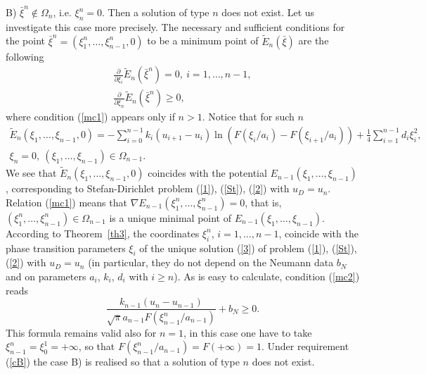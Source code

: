 \documentclass[10pt,a4paper]{amsart}
\numberwithin{equation}{section}
\begin{document}
B) $\bar\xi^n\notin\Omega_n$, i.e. $\xi_n^n=0$. Then a solution of type $n$ does not exist. Let us investigate this case more precisely. The necessary and sufficient conditions for the point $\bar\xi^n=(\xi_1^n,\ldots,\xi_{n-1}^n,0)$ to be a minimum point of $\tilde E_n(\bar\xi)$ are the following
\begin{align}
\label{mc1}
\frac{\partial}{\partial\xi_i} \tilde E_n(\bar\xi^n)=0, \ i=1,\ldots,n-1, \\
\label{mc2}
\frac{\partial}{\partial\xi_n} \tilde E_n(\bar\xi^n)\ge 0,
\end{align}
where condition (\ref{mc1}) appears only if $n>1$. Notice that for such $n$
\begin{align*}
\tilde E_n(\xi_1,\ldots,\xi_{n-1},0)=-\sum_{i=0}^{n-1}k_i(u_{i+1}-u_i)\ln (F(\xi_i/a_i)-F(\xi_{i+1}/a_i))
+\frac{1}{4}\sum_{i=1}^{n-1} d_i\xi_i^2, \\ \xi_n=0, \ (\xi_1,\ldots,\xi_{n-1})\in\Omega_{n-1}.
\end{align*}
We see that $\tilde E_n(\xi_1,\ldots,\xi_{n-1},0)$ coincides with the potential $E_{n-1}(\xi_1,\ldots,\xi_{n-1})$, corresponding to
Stefan-Dirichlet problem (\ref{1}), (\ref{St}), (\ref{2}) with $u_D=u_n$.
Relation (\ref{mc1}) means that $\nabla E_{n-1}(\xi_1^n,\ldots,\xi_{n-1}^n)=0$, that is, $(\xi_1^n,\ldots,\xi_{n-1}^n)\in\Omega_{n-1}$ is a unique minimal point of $E_{n-1}(\xi_1,\ldots,\xi_{n-1})$. According to Theorem~\ref{th3}, the coordinates $\xi_i^n$, $i=1,\ldots,n-1$, coincide with the phase transition parameters $\xi_i$ of the unique solution (\ref{3}) of problem (\ref{1}), (\ref{St}), (\ref{2}) with $u_D=u_n$ (in particular, they do not depend on the Neumann data $b_N$ and on parameters $a_i$, $k_i$, $d_i$ with $i\ge n$). As is easy to calculate, condition (\ref{mc2}) reads
\begin{equation}\label{cB}
\frac{k_{n-1}(u_n-u_{n-1})}{\sqrt{\pi}a_{n-1}F(\xi_{n-1}^n/a_{n-1})}+b_N\ge 0.
\end{equation}
This formula remains valid also for $n=1$, in this case one have to take $\xi_{n-1}^n=\xi_0^1=+\infty$, so that
$F(\xi_{n-1}^n/a_{n-1})=F(+\infty)=1$. Under requirement (\ref{cB}) the case B) is realised so that a solution of type $n$ does not exist.
\end{document}
